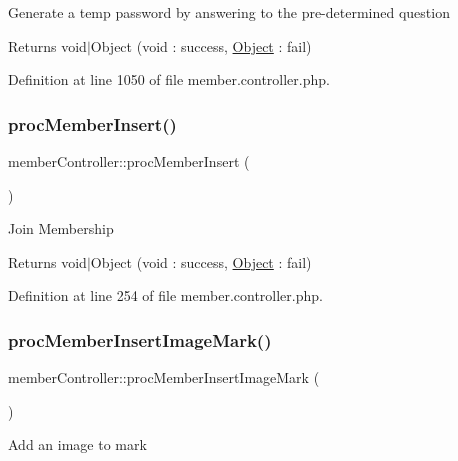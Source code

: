 Generate a temp password by answering to the pre-\/determined question

\begin{DoxyReturn}{Returns}
void$\vert$\+Object (void \+: success, \hyperlink{classObject}{Object} \+: fail) 
\end{DoxyReturn}


Definition at line 1050 of file member.\+controller.\+php.

\hypertarget{classmemberController_a8f176054f72833b01e2229108da0b599}{}\label{classmemberController_a8f176054f72833b01e2229108da0b599} 
\subsubsection{\texorpdfstring{proc\+Member\+Insert()}{procMemberInsert()}}
{\footnotesize\ttfamily member\+Controller\+::proc\+Member\+Insert (\begin{DoxyParamCaption}{ }\end{DoxyParamCaption})}

Join Membership

\begin{DoxyReturn}{Returns}
void$\vert$\+Object (void \+: success, \hyperlink{classObject}{Object} \+: fail) 
\end{DoxyReturn}


Definition at line 254 of file member.\+controller.\+php.

\hypertarget{classmemberController_afcb874e178e1c13158e364b891998640}{}\label{classmemberController_afcb874e178e1c13158e364b891998640} 
\subsubsection{\texorpdfstring{proc\+Member\+Insert\+Image\+Mark()}{procMemberInsertImageMark()}}
{\footnotesize\ttfamily member\+Controller\+::proc\+Member\+Insert\+Image\+Mark (\begin{DoxyParamCaption}{ }\end{DoxyParamCaption})}

Add an image to mark

